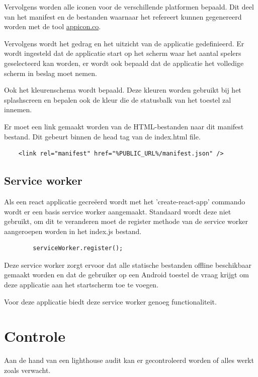 		
		Vervolgens worden alle iconen voor de verschillende platformen bepaald. Dit deel van het manifest en de bestanden waarnaar het refereert kunnen gegenereerd worden met de tool \href{https://appicon.co}{appicon.co}.
		
		Vervolgens wordt het gedrag en het uitzicht van de applicatie gedefinieerd. Er wordt ingesteld dat de applicatie start op het scherm waar het aantal spelers geselecteerd kan worden, er wordt ook bepaald dat de applicatie het volledige scherm in beslag moet nemen.
		
		Ook het kleurenschema wordt bepaald. Deze kleuren worden gebruikt bij het splashscreen en bepalen ook de kleur die de statusbalk van het toestel zal innemen. 
		
		Er moet een link gemaakt worden van de HTML-bestanden naar dit manifest bestand. Dit gebeurt binnen de head tag van de index.html file.
		
\begin{lstlisting}
	<link rel="manifest" href="%PUBLIC_URL%/manifest.json" />
\end{lstlisting}
		
		
	\subsection{Service worker}
		
		Als een react applicatie gecreëerd wordt met het 'create-react-app' commando wordt er  een basis service worker aangemaakt. Standaard wordt deze niet gebruikt, om dit te veranderen moet de register methode van de service worker aangeroepen worden in het index.js bestand.
		
\begin{lstlisting}
		serviceWorker.register();
\end{lstlisting}
		
		Deze service worker zorgt ervoor dat alle statische bestanden offline beschikbaar gemaakt worden en dat de gebruiker op een Android toestel de vraag krijgt om deze applicatie aan het startscherm toe te voegen.
		
		Voor deze applicatie biedt deze service worker genoeg functionaliteit.
		
\newpage
\section{Controle}

	Aan de hand van een lighthouse audit kan er gecontroleerd worden of alles werkt zoals verwacht.
	
